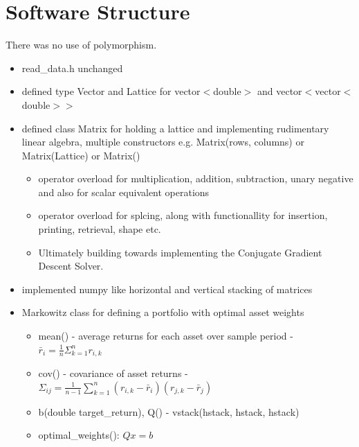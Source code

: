 \documentclass[12pt,twoside]{article}
\begin{document}


\section{Software Structure}

There was no use of polymorphism.
\begin{itemize}[nosep]
    \item read\_data.h unchanged
    \item defined type Vector and Lattice for vector$<$double$>$ and vector$<$vector$<$double$>$$>$
    \item defined class Matrix for holding a lattice and implementing rudimentary linear algebra, multiple constructors e.g. Matrix(rows, columns) or Matrix(Lattice) or Matrix()
    \begin{itemize}[nosep]
        \item operator overload for multiplication, addition, subtraction, unary negative and also for scalar equivalent operations
        \item operator overload for splcing, along with functionallity for insertion, printing, retrieval, shape etc.
        \item Ultimately building towards implementing the Conjugate Gradient Descent Solver.
    \end{itemize}
    \item implemented numpy like horizontal and vertical stacking of matrices
    \item Markowitz class for defining a portfolio with optimal asset weights
    \begin{itemize}[nosep]
        \item mean() - average returns for each asset over sample period - $\bar{r}_i = \frac{1}{n}\Sigma_{k=1}^n r_{i,k} $
        \item cov() - covariance of asset returns - $\Sigma_{ij} = \frac{1}{n - 1}\sum_{k=1}^n (r_{i,k} - \bar{r}_i)(r_{j,k} - \bar{r}_j)$
        \item b(double target\_return), Q() - vstack(hstack, hstack, hstack)
        \item optimal\_weights(): $Q x = b$
    \end{itemize}
\end{itemize}

\vspace{1cm}
\end{document}
